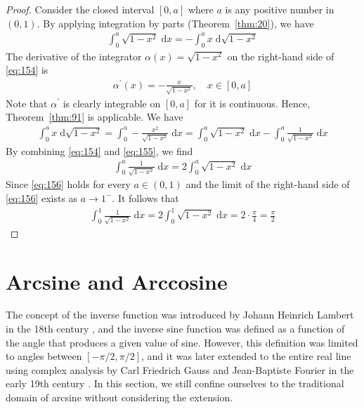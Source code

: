 \documentclass[thmcnt=section, 12pt]{my-elegantbook}
\begin{document}
\begin{proof}
    Consider the closed interval $[0, a]$
    where $a$ is any positive number in $(0, 1)$.
    By applying integration by parts (Theorem~\ref{thm:20}),
    we have
    \begin{align}
        \int_0^a \sqrt{1 - x^2} \; \mathrm{d}x
        = - \int_0^a x \; \mathrm{d} \sqrt{1 - x^2}
        \label{eq:154}
    \end{align}
    The derivative of the integrator $\alpha(x) = \sqrt{1-x^2}$
    on the right-hand side of \eqref{eq:154} is
    \begin{align*}
        \alpha^\prime(x)
        = -\frac{x}{\sqrt{1-x^2}},
        \quad x \in [0, a]
    \end{align*}
    Note that $\alpha^\prime$ is clearly integrable on $[0, a]$
    for it is continuous.
    Hence, Theorem~\ref{thm:91} is applicable.
    We have
    \begin{align}
        \int_0^a x \; \mathrm{d} \sqrt{1-x^2}
        = \int_0^a -\frac{x^2}{\sqrt{1-x^2}} \; \mathrm{d} x
        = \int_0^a \sqrt{1-x^2} \; \mathrm{d}x
        - \int_0^a \frac{1}{\sqrt{1-x^2}} \; \mathrm{d}x
        \label{eq:155}
    \end{align}
    By combining \eqref{eq:154} and \eqref{eq:155}, we find
    \begin{align}
        \int_0^a \frac{1}{\sqrt{1-x^2}} \; \mathrm{d}x
        = 2 \int_0^a \sqrt{1 - x^2} \; \mathrm{d} x
        \label{eq:156}
    \end{align}
    Since \eqref{eq:156} holds for every $a \in (0, 1)$
    and the limit of the right-hand side of \eqref{eq:156}
    exists as $a \to 1^-$.
    It follows that
    \begin{align*}
        \int_0^1 \frac{1}{\sqrt{1-x^2}} \; \mathrm{d}x
        = 2 \int_0^1 \sqrt{1-x^2} \; \mathrm{d}x
        = 2 \cdot \frac{\pi}{4}
        = \frac{\pi}{2}
    \end{align*}
\end{proof}


\section{Arcsine and Arccosine}

The concept of the inverse function was introduced
by Johann Heinrich Lambert
in the 18th century \cite{boyerHistoryCalculusIts1988},
and the inverse sine function was defined as a function of
the angle that produces a given value of sine.
However, this definition was limited to angles
between $[-\pi/2, \pi/2]$,
and it was later extended to the entire real line
using complex analysis by
Carl Friedrich Gauss and Jean-Baptiste Fourier
in the early 19th century \cite{edwardsHistoricalDevelopmentCalculus1994}.
In this section, we still confine ourselves to
the traditional domain of arcsine
without considering the extension.
\end{document}
